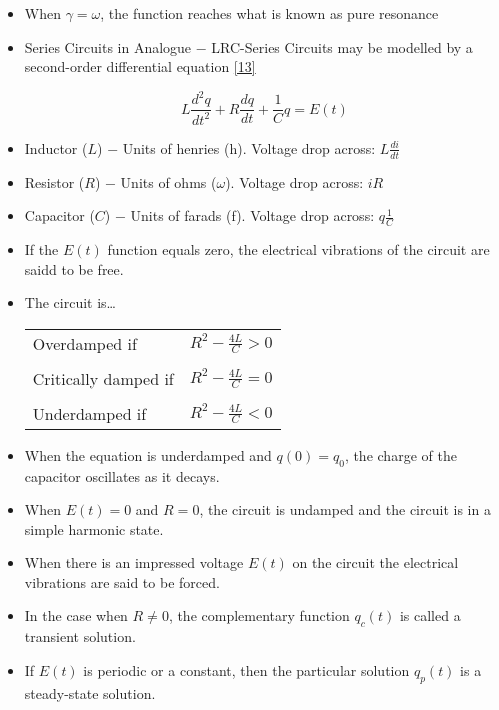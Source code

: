 \documentclass[12pt]{article}
\begin{document}
\begin{itemize}
\item When $\gamma=\omega$, the function reaches what is known as pure resonance

\item Series Circuits in Analogue $-$ LRC-Series Circuits may be modelled by a second-order differential equation \eqref{13}

  \begin{equation}
    L\frac{d^2q}{dt^2}+R\frac{dq}{dt}+\frac{1}{C}q=E(t)
    \label{13}
  \end{equation}

\item Inductor ($L$) $-$ Units of henries (h). Voltage drop across: $L\frac{di}{dt}$

\item Resistor ($R$) $-$ Units of ohms ($\omega$). Voltage drop across: $iR$

\item Capacitor ($C$) $-$ Units of farads (f). Voltage drop across: $q\frac{1}{C}$

\item If the $E(t)$ function equals zero, the electrical vibrations of the circuit are saidd to be free. 

\item The circuit is\dots

  \begin{tabular}[h]{l r}
    Overdamped if & $R^2-\frac{4L}{C}>0$\\
    & \\
    Critically damped if & $R^2-\frac{4L}{C}=0$\\
    & \\
    Underdamped if & $R^2-\frac{4L}{C}<0$\\
  \end{tabular}

\item When the equation is underdamped and $q(0)=q_0$, the charge of the capacitor oscillates as it decays.

\item When $E(t)=0$ and $R=0$, the circuit is undamped and the circuit is in a simple harmonic state. 

\item When there is an impressed voltage $E(t)$ on the circuit the electrical vibrations are said to be forced.

\item In the case when $R\neq0$, the complementary function $q_c(t)$ is called a transient solution.

\item If $E(t)$ is periodic or a constant, then the particular solution $q_p(t)$ is a steady-state solution.

\end{itemize}
\end{document}
